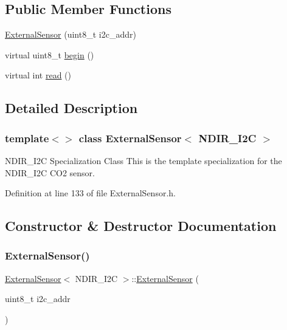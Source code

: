 \subsection*{Public Member Functions}
\begin{DoxyCompactItemize}
\item 
\hyperlink{class_external_sensor_3_01_n_d_i_r___i2_c_01_4_aa06970ea689679c0e1deb5360e05a0a4}{External\+Sensor} (uint8\+\_\+t i2c\+\_\+addr)
\item 
virtual uint8\+\_\+t \hyperlink{class_external_sensor_3_01_n_d_i_r___i2_c_01_4_ac6f3614d94968ef0cc11b2b4d69cef03}{begin} ()
\item 
virtual int \hyperlink{class_external_sensor_3_01_n_d_i_r___i2_c_01_4_add67f5ecaf47d2ee675e8299aee7322d}{read} ()
\end{DoxyCompactItemize}


\subsection{Detailed Description}
\subsubsection*{template$<$$>$\newline
class External\+Sensor$<$ N\+D\+I\+R\+\_\+\+I2\+C $>$}

N\+D\+I\+R\+\_\+\+I2C Specialization Class This is the template specialization for the N\+D\+I\+R\+\_\+\+I2C C\+O2 sensor. 

Definition at line 133 of file External\+Sensor.\+h.



\subsection{Constructor \& Destructor Documentation}
\mbox{\label{class_external_sensor_3_01_n_d_i_r___i2_c_01_4_aa06970ea689679c0e1deb5360e05a0a4}} 
\subsubsection{\texorpdfstring{External\+Sensor()}{ExternalSensor()}}
{\footnotesize\ttfamily \hyperlink{class_external_sensor}{External\+Sensor}$<$ N\+D\+I\+R\+\_\+\+I2C $>$\+::\hyperlink{class_external_sensor}{External\+Sensor} (\begin{DoxyParamCaption}\item[{uint8\+\_\+t}]{i2c\+\_\+addr }\end{DoxyParamCaption})\hspace{0.3cm}{\ttfamily [inline]}}

